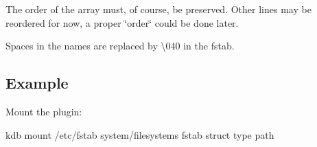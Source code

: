 The order of the array must, of course, be preserved. Other lines may be reordered for now, a proper \char`\"{}order\char`\"{} could be done later.

Spaces in the names are replaced by \textbackslash{}040 in the fstab.

\subsection*{Example}

Mount the plugin\+: \begin{DoxyVerb}kdb mount /etc/fstab system/filesystems fstab struct type path\end{DoxyVerb}
 